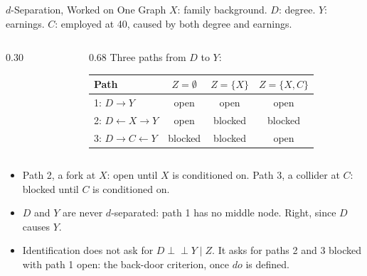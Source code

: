 \documentclass[aspectratio=169,11pt,xcolor=dvipsnames]{beamer}
\newcommand{\indep}{\perp\!\!\!\perp}
\begin{document}
\begin{frame}{$d$-Separation, Worked on One Graph}
$X$: family background. $D$: degree. $Y$: earnings. $C$: employed at 40,
caused by both degree and earnings.
\begin{columns}[c]
\begin{column}{0.30\textwidth}
\centering
{}
\end{column}
\begin{column}{0.68\textwidth}
Three paths from $D$ to $Y$:
\begin{center}\small
\renewcommand{\arraystretch}{1.1}
\begin{tabular}{lccc}
\toprule
Path & $Z = \emptyset$ & $Z = \{X\}$ & $Z = \{X, C\}$ \\
\midrule
1: $D \to Y$ & open & open & open \\
2: $D \leftarrow X \to Y$ & open & blocked & blocked \\
3: $D \to C \leftarrow Y$ & blocked & blocked & \alert{open} \\
\bottomrule
\end{tabular}
\end{center}
\end{column}
\end{columns}
\vskip2pt
\begin{itemize}\itemsep1pt
  \item Path 2, a fork at $X$: open until $X$ is conditioned on. Path 3, a
        collider at $C$: blocked until $C$ is conditioned on.
  \item $D$ and $Y$ are never $d$-separated: path 1 has no middle node.
        Right, since $D$ causes $Y$.
  \item Identification does not ask for $D \indep Y \mid Z$. It asks for
        paths 2 and 3 blocked with path 1 open: the back-door criterion,
        once $do$ is defined.
\end{itemize}
\end{frame}
\end{document}
